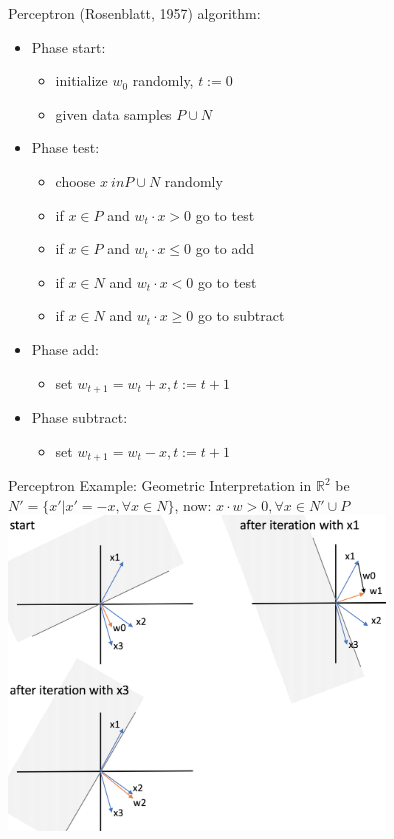 \documentclass{beamer}
\begin{document}
\begin{frame}{Perceptron (Rosenblatt, 1957)}
algorithm:
\begin{itemize}
\item Phase start: 
  \begin{itemize}
  \item initialize $w_0$ randomly, $t:=0$
  \item given data samples $P\cup N$ 
  \end{itemize}
\item Phase test:
  \begin{itemize}
  	\item choose $x \ in P\cup N$ randomly
	\item if $x\in P$ and $w_t \cdot x > 0 $ go to test
    \item if $x\in P$ and $w_t \cdot x \leq 0 $ go to add
    \item if $x\in N$ and $w_t \cdot x < 0 $ go to test
    \item if $x\in N$ and $w_t \cdot x \geq 0 $ go to subtract
  \end{itemize}
\item Phase add:
  \begin{itemize}
  \item set $w_{t+1} = w_t + x, t:= t+1$
  \end{itemize}
\item Phase subtract:
  \begin{itemize}
  \item set $w_{t+1} = w_t - x, t:= t+1$
  \end{itemize}
\end{itemize}
\end{frame}

\begin{frame}{Perceptron Example: Geometric Interpretation in $\mathbb{R}^2$}
be $N' = \{x' | x' = -x, \forall x \in N\}$, now: $x \cdot w > 0, \forall x \in N' \cup P$
\centering
\includegraphics[width=0.75\textwidth]{perceptron2}
\end{frame}
\end{document}
